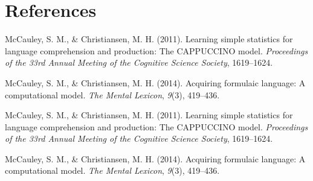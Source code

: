 \documentclass[man,mask,floatsintext]{apa6}
\begin{document}
\newpage

\section{References}\label{references}

\begingroup
\setlength{\parindent}{-0.5in} \setlength{\leftskip}{0.5in}

\hypertarget{refs}{}
\hypertarget{ref-mccauley2011learning}{}
McCauley, S. M., \& Christiansen, M. H. (2011). Learning simple
statistics for language comprehension and production: The CAPPUCCINO
model. \emph{Proceedings of the 33rd Annual Meeting of the Cognitive
Science Society}, 1619--1624.

\hypertarget{ref-mccauley2014acquiring}{}
McCauley, S. M., \& Christiansen, M. H. (2014). Acquiring formulaic
language: A computational model. \emph{The Mental Lexicon}, \emph{9}(3),
419--436.

\hypertarget{ref-mccauley2011learning}{}
McCauley, S. M., \& Christiansen, M. H. (2011). Learning simple
statistics for language comprehension and production: The CAPPUCCINO
model. \emph{Proceedings of the 33rd Annual Meeting of the Cognitive
Science Society}, 1619--1624.

\hypertarget{ref-mccauley2014acquiring}{}
McCauley, S. M., \& Christiansen, M. H. (2014). Acquiring formulaic
language: A computational model. \emph{The Mental Lexicon}, \emph{9}(3),
419--436.

\endgroup
\end{document}
